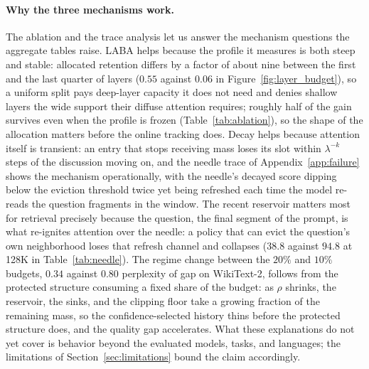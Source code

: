 \paragraph{Why the three mechanisms work.}
The ablation and the trace analysis let us answer the mechanism
questions the aggregate tables raise. LABA helps because the profile
it measures is both steep and stable: allocated retention differs by
a factor of about nine between the first and the last quarter of
layers ($0.55$ against $0.06$ in Figure~\ref{fig:layer_budget}), so a
uniform split pays deep-layer capacity it does not need and denies
shallow layers the wide support their diffuse attention requires;
roughly half of the gain survives even when the profile is frozen
(Table~\ref{tab:ablation}), so the shape of the allocation matters
before the online tracking does. Decay helps because attention itself
is transient: an entry that stops receiving mass loses its slot
within $\lambda^{-k}$ steps of the discussion moving on, and the
needle trace of Appendix~\ref{app:failure} shows the mechanism
operationally, with the needle's decayed score dipping below the
eviction threshold twice yet being refreshed each time the model
re-reads the question fragments in the window. The recent reservoir
matters most for retrieval precisely because the question, the final
segment of the prompt, is what re-ignites attention over the needle:
a policy that can evict the question's own neighborhood loses that
refresh channel and collapses ($38.8$ against $94.8$ at 128K in
Table~\ref{tab:needle}). The regime change between the $20\%$ and
$10\%$ budgets, $0.34$ against $0.80$ perplexity of gap on
WikiText-2, follows from the protected structure consuming a fixed
share of the budget: as $\rho$ shrinks, the reservoir, the sinks, and
the clipping floor take a growing fraction of the remaining mass, so
the confidence-selected history thins before the protected structure
does, and the quality gap accelerates. What these explanations do not
yet cover is behavior beyond the evaluated models, tasks, and
languages; the limitations of Section~\ref{sec:limitations} bound the
claim accordingly.

